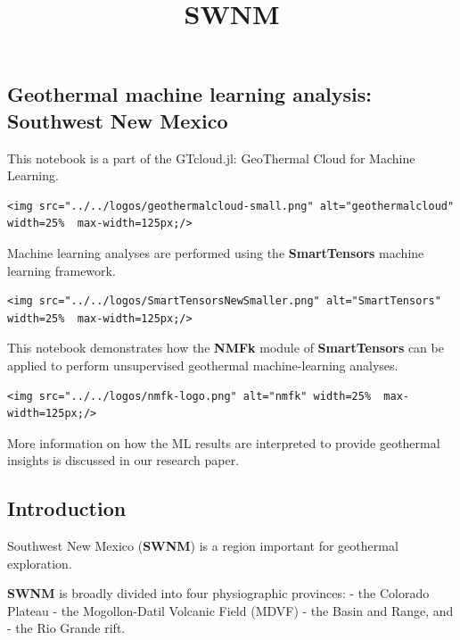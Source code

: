 \documentclass[11pt]{article}
\title{SWNM}
\begin{document}
    
    \maketitle
    
    

    
    \hypertarget{geothermal-machine-learning-analysis-southwest-new-mexico}{%
\subsection{Geothermal machine learning analysis: Southwest New
Mexico}\label{geothermal-machine-learning-analysis-southwest-new-mexico}}

This notebook is a part of the GTcloud.jl: GeoThermal Cloud for Machine
Learning.

\begin{verbatim}
<img src="../../logos/geothermalcloud-small.png" alt="geothermalcloud" width=25%  max-width=125px;/>
\end{verbatim}

Machine learning analyses are performed using the \textbf{SmartTensors}
machine learning framework.

\begin{verbatim}
<img src="../../logos/SmartTensorsNewSmaller.png" alt="SmartTensors" width=25%  max-width=125px;/>
\end{verbatim}

This notebook demonstrates how the \textbf{NMFk} module of
\textbf{SmartTensors} can be applied to perform unsupervised geothermal
machine-learning analyses.

\begin{verbatim}
<img src="../../logos/nmfk-logo.png" alt="nmfk" width=25%  max-width=125px;/>
\end{verbatim}

More information on how the ML results are interpreted to provide
geothermal insights is discussed in our research paper.

    \hypertarget{introduction}{%
\subsection{Introduction}\label{introduction}}

Southwest New Mexico (\textbf{SWNM}) is a region important for
geothermal exploration.

\textbf{SWNM} is broadly divided into four physiographic provinces: -
the Colorado Plateau - the Mogollon-Datil Volcanic Field (MDVF) - the
Basin and Range, and - the Rio Grande rift.
\end{document}
